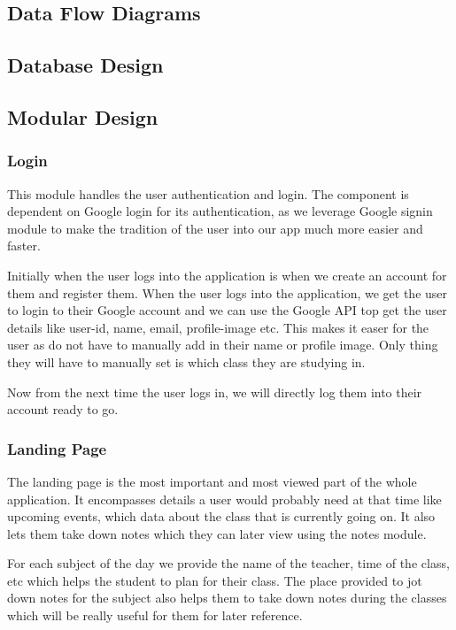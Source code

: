 \documentclass{article}
\begin{document}
\subsection{Data Flow Diagrams}
\vspace{1em}
\subsection{Database Design}
\vspace{1em}
\subsection{Modular Design}

\subsubsection{Login}
This module handles the user authentication and login.
The component is dependent on Google login for its authentication, as we leverage Google signin module to make the tradition of the user into our app much more easier and faster.

Initially when the user logs into the application is when we create an account for them and register them. When the user logs into the application, we get the user to login to their Google account and we can use the Google API top get the user details like user-id, name, email, profile-image etc. This makes it easer for the user as do not have to manually add in their name or profile image. Only thing they will have to manually set is which class they are studying in.

Now from the next time the user logs in, we will directly log them into their account ready to go.

\subsubsection{Landing Page}
The landing page is the most important and most viewed part of the whole application. It encompasses details a user would probably need at that time like upcoming events, which data about the class that is currently going on. It also lets them take down notes which they can later view using the notes module.

For each subject of the day we provide the name of the teacher, time of the class, etc which helps the student to plan for their class.
The place provided to jot down notes for the subject also helps them to take down notes during the classes which will be really useful for them for later reference.
\end{document}
